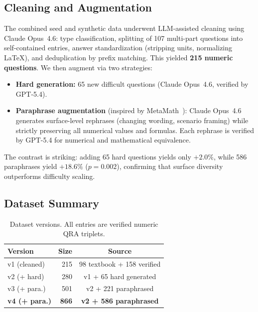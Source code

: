 \subsection{Cleaning and Augmentation}
\label{sec:data:augment}

The combined seed and synthetic data underwent LLM-assisted cleaning using Claude Opus~4.6: type classification, splitting of 107 multi-part questions into self-contained entries, answer standardization (stripping units, normalizing LaTeX), and deduplication by prefix matching. This yielded \textbf{215 numeric questions}. We then augment via two strategies:

\begin{itemize}
    \item \textbf{Hard generation:} 65 new difficult questions (Claude Opus~4.6, verified by GPT-5.4).
    \item \textbf{Paraphrase augmentation} (inspired by MetaMath~\cite{yu2024metamath}): Claude Opus~4.6 generates surface-level rephrases (changing wording, scenario framing) while strictly preserving all numerical values and formulas. Each rephrase is verified by GPT-5.4 for numerical and mathematical equivalence.
\end{itemize}

The contrast is striking: adding 65 hard questions yields only $+2.0\%$, while 586 paraphrases yield $+18.6\%$ ($p=0.002$), confirming that surface diversity outperforms difficulty scaling.

\subsection{Dataset Summary}
\label{sec:data:summary}

\begin{table}[t]
\centering
\small
\caption{Dataset versions. All entries are verified numeric QRA triplets.}
\label{tab:datasets}
\begin{tabular}{@{}lrc@{}}
\toprule
Version & Size & Source \\
\midrule
v1 (cleaned) & 215 & 98 textbook + 158 verified \\
v2 (+ hard)  & 280 & v1 + 65 hard generated \\
v3 (+ para.) & 501 & v2 + 221 paraphrased \\
\textbf{v4 (+ para.)} & \textbf{866} & \textbf{v2 + 586 paraphrased} \\
\bottomrule
\end{tabular}
\end{table}
